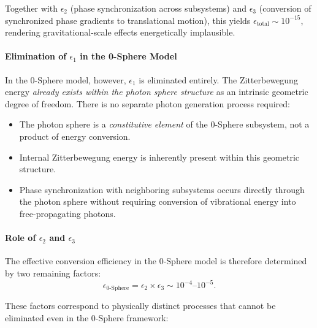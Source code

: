 \documentclass[
 reprint,
 amsmath,amssymb,
 aps,
 prb,
]{revtex4-2}
\numberwithin{equation}{section}
\begin{document}
Together with $\epsilon_2$ (phase synchronization across subsystems) and $\epsilon_3$ (conversion of synchronized phase gradients to translational motion), this yields $\epsilon_{\text{total}} \sim 10^{-15}$, rendering gravitational-scale effects energetically implausible.

\vspace{0.5cm}

\paragraph{Elimination of $\epsilon_1$ in the 0-Sphere Model}

In the 0-Sphere model, however, $\epsilon_1$ is eliminated entirely. The Zitterbewegung energy \textit{already exists within the photon sphere structure} as an intrinsic geometric degree of freedom. There is no separate photon generation process required:

\begin{itemize}
\item The photon sphere is a \textit{constitutive element} of the 0-Sphere subsystem, not a product of energy conversion.
\item Internal Zitterbewegung energy is inherently present within this geometric structure.
\item Phase synchronization with neighboring subsystems occurs directly through the photon sphere without requiring conversion of vibrational energy into free-propagating photons.
\end{itemize}

\paragraph{Role of $\epsilon_2$ and $\epsilon_3$}

The effective conversion efficiency in the 0-Sphere model is therefore determined by two remaining factors:
\begin{equation}
\epsilon_{\text{0-Sphere}} = \epsilon_2 \times \epsilon_3 \sim 10^{-4}\text{--}10^{-5}.
\end{equation}

These factors correspond to physically distinct processes that cannot be eliminated even in the 0-Sphere framework:
\end{document}
